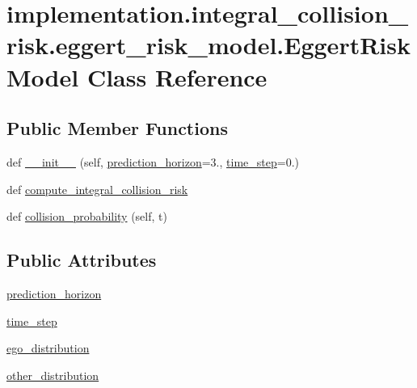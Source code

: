 \hypertarget{classimplementation_1_1integral__collision__risk_1_1eggert__risk__model_1_1_eggert_risk_model}{}\section{implementation.\+integral\+\_\+collision\+\_\+risk.\+eggert\+\_\+risk\+\_\+model.\+Eggert\+Risk\+Model Class Reference}
\label{classimplementation_1_1integral__collision__risk_1_1eggert__risk__model_1_1_eggert_risk_model}
\subsection*{Public Member Functions}
\begin{DoxyCompactItemize}
\item 
def \hyperlink{classimplementation_1_1integral__collision__risk_1_1eggert__risk__model_1_1_eggert_risk_model_a210c2b1883d4ad0cedf2c7b6487ce7ac}{\+\_\+\+\_\+init\+\_\+\+\_\+} (self, \hyperlink{classimplementation_1_1integral__collision__risk_1_1eggert__risk__model_1_1_eggert_risk_model_a1802676872e3d803a0ffd31c7ee599af}{prediction\+\_\+horizon}=3., \hyperlink{classimplementation_1_1integral__collision__risk_1_1eggert__risk__model_1_1_eggert_risk_model_ab49bb9dc79cf1eb614f626353b1bd235}{time\+\_\+step}=0.)
\item 
def \hyperlink{classimplementation_1_1integral__collision__risk_1_1eggert__risk__model_1_1_eggert_risk_model_aa4f0b07a9f0e3b119f3a9bae88218151}{compute\+\_\+integral\+\_\+collision\+\_\+risk}
\item 
def \hyperlink{classimplementation_1_1integral__collision__risk_1_1eggert__risk__model_1_1_eggert_risk_model_aec8bbfca86476257ff60d9eba247ef05}{collision\+\_\+probability} (self, t)
\end{DoxyCompactItemize}
\subsection*{Public Attributes}
\begin{DoxyCompactItemize}
\item 
\hyperlink{classimplementation_1_1integral__collision__risk_1_1eggert__risk__model_1_1_eggert_risk_model_a1802676872e3d803a0ffd31c7ee599af}{prediction\+\_\+horizon}
\item 
\hyperlink{classimplementation_1_1integral__collision__risk_1_1eggert__risk__model_1_1_eggert_risk_model_ab49bb9dc79cf1eb614f626353b1bd235}{time\+\_\+step}
\item 
\hyperlink{classimplementation_1_1integral__collision__risk_1_1eggert__risk__model_1_1_eggert_risk_model_a753d4b6b26de15d2de0df77d880deb94}{ego\+\_\+distribution}
\item 
\hyperlink{classimplementation_1_1integral__collision__risk_1_1eggert__risk__model_1_1_eggert_risk_model_aeeaafbb7e223b4d2c40067f83955c50c}{other\+\_\+distribution}
\end{DoxyCompactItemize}


